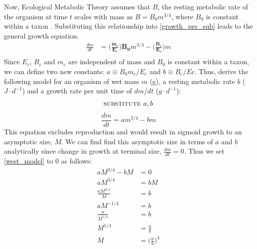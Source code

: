 \documentclass[a4paper]{article} %
\begin{document}
Now, Ecological Metabolic Theory assumes that $B$, the resting metabolic rate of the organism at time $t$ scales with mass as $B = B_{0}m^{3/4}$, where $B_0$ is constant within a taxon \autocite{West1997,brown2000-scaling-book, Brown2004}. Substituting this relationship into \cref{growth_pre_sub} leads to the general growth equation.
\begin{align*}
    \frac{dm}{dt} &= \bm{\Bigg(\frac{m_c}{E_c}\Bigg)B_{0}}m^{3/4} - \bm{\Bigg(\frac{B_{c}}{E_c}\Bigg)}m \\
\end{align*}
Since $E_c$, $B_c$ and $m_c$ are independent of mass and $B_0$ is constant within a taxon, we can define two new constants: $a \equiv B_{0}m_{c}/E_{c}$ and $b \equiv B_{c}/E{c}$. Thus, \textcite{West2001} derive the following model for an organism of wet mass $m$ (g), a resting metabolic rate $b$ ($J \cdot d^{-1}$) and a growth rate per unit time of $dm/dt$ ($g \cdot d^{-1}$):
\begin{align*}
    \textsc{substitute }a, b
\end{align*}
\begin{equation}
    \frac{dm}{dt} = am^{3/4} - bm \label{west_model}
\end{equation}
This equation excludes reproduction and would result in sigmoid growth to an asymptotic size, $M$. We can find find this asymptotic size in terms of $a$ and $b$ analytically since change in growth at terminal size, $\frac{dm}{dt} = 0$. Thus we set \cref{west_model} to 0 as follows:
\begin{align*}
    aM^{3/4} - bM &= 0 \\
    aM^{3/4} &= bM \\
    \frac{aM^{3/4}}{M} &= b \\
    aM^{-1/4} &= b \\
    \frac{a}{M^{1/4}} &= b \\
    M^{1/4} &= \frac{a}{b} \\
    M &= \Big(\frac{a}{b}\Big)^4
\end{align*}
\end{document}
